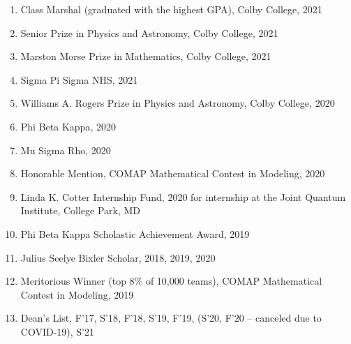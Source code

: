 \documentclass[10pt]{article}
\begin{document}
\begin{enumerate}
	\setlength\itemsep{-4pt}
	\item Class Marshal (graduated with the highest GPA), Colby College, {2021}
	\item Senior Prize in Physics and Astronomy, Colby College, {2021}
	\item Marston Morse Prize in Mathematics, Colby College, {2021}
	\item Sigma Pi Sigma NHS, {2021}
	\item {Williams A. Rogers Prize in Physics and Astronomy}, Colby College, {2020} 
	\item {Phi Beta Kappa}, {2020} 
	\item {Mu Sigma Rho}, {2020}
	\item {Honorable Mention,}  COMAP Mathematical Contest in Modeling, {2020}
	\item {Linda K. Cotter Internship Fund}, {2020} for internship at the Joint Quantum Institute, College Park, MD
	\item {Phi Beta Kappa Scholastic Achievement Award,} {2019}
	\item {Julius Seelye Bixler Scholar,} {2018, 2019, 2020}
	\item {Meritorious Winner (top 8\% of 10,000 teams),}  COMAP Mathematical Contest in Modeling, {2019}
	\item {Dean’s List}, {F'17, S'18, F'18, S'19, F'19, (S'20, F'20 -- canceled due to COVID-19), S'21}
\end{enumerate}
\end{document}

